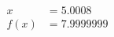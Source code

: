 \documentclass[preview]{standalone}
\begin{document}
\begin{align*}
x &= 5.0008\\f(x) &= 7.9999999
\end{align*}
\end{document}
